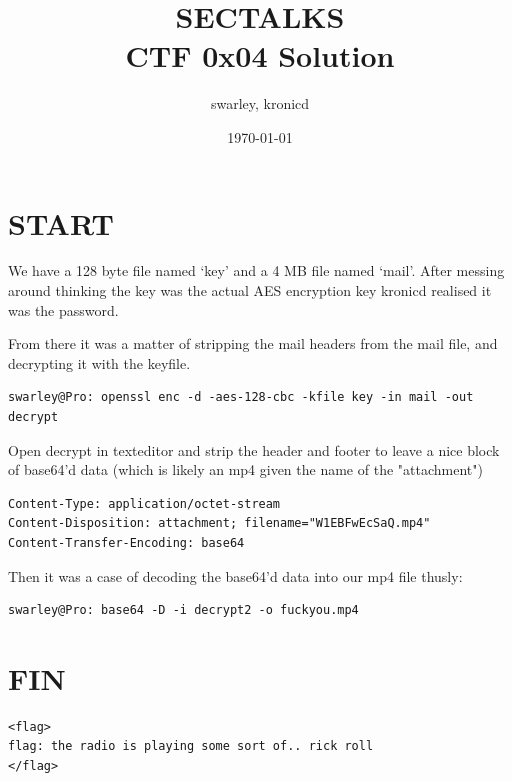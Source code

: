 \documentclass[11pt]{report}
\begin{document}


\title{SECTALKS\\CTF 0x04 Solution}
\author{swarley, kronicd}
\date{\today}
\maketitle
\section{START}

We have a 128 byte file named `key' and a 4 MB file named `mail'.
After messing around thinking the key was the actual AES encryption key kronicd realised it was the password.

From there it was a matter of stripping the mail headers from the mail file, and decrypting it with the keyfile.\\
\begin{lstlisting}
swarley@Pro: openssl enc -d -aes-128-cbc -kfile key -in mail -out decrypt
\end{lstlisting}

Open decrypt in texteditor and strip the header and footer to leave a nice block of base64'd data (which is likely an mp4 given the name of the "attachment")\\
\begin{lstlisting}
Content-Type: application/octet-stream
Content-Disposition: attachment; filename="W1EBFwEcSaQ.mp4"
Content-Transfer-Encoding: base64
\end{lstlisting}

Then it was a case of decoding the base64'd data into our mp4 file thusly:
\begin{lstlisting}
swarley@Pro: base64 -D -i decrypt2 -o fuckyou.mp4
\end{lstlisting}

\section{FIN}

\begin{lstlisting}
<flag>
flag: the radio is playing some sort of.. rick roll
</flag>
\end{lstlisting}
\end{document}
